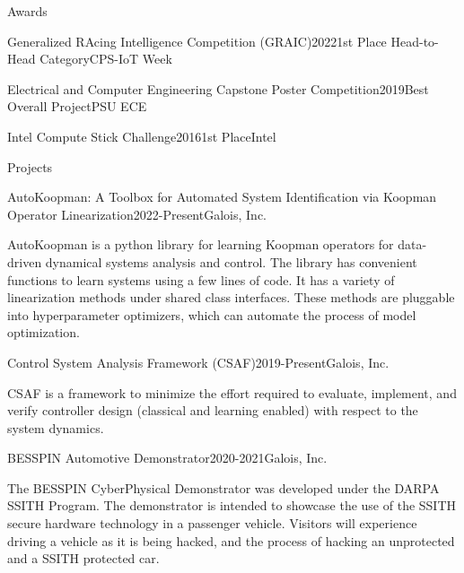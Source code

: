 \documentclass{resume}
\begin{document}
\begin{rSection}{Awards}
\begin{rSubsectionEmpty}{Generalized RAcing Intelligence Competition (GRAIC)}{2022}{1st Place Head-to-Head Category}{CPS-IoT Week}\end{rSubsectionEmpty}

\begin{rSubsectionEmpty}{Electrical and Computer Engineering Capstone Poster Competition}{2019}{Best Overall Project}{PSU ECE}\end{rSubsectionEmpty}

\begin{rSubsectionEmpty}{Intel Compute Stick Challenge}{2016}{1st Place}{Intel}\end{rSubsectionEmpty}
\end{rSection}


\begin{rSection}{Projects}

\begin{rSubsection}{AutoKoopman: A Toolbox for Automated System Identification via Koopman Operator Linearization}{2022-Present}{}{Galois, Inc.}
\item AutoKoopman is a python library for learning Koopman operators for data-driven dynamical systems analysis and control. The library has convenient functions to learn systems using a few lines of code. It has a variety of linearization methods under shared class interfaces. These methods are pluggable into hyperparameter optimizers, which can automate the process of model optimization.
\end{rSubsection}

\begin{rSubsection}{Control System Analysis Framework (CSAF)}{2019-Present}{}{Galois, Inc.}
\item CSAF is a framework to minimize the effort required to evaluate, implement, and verify controller design (classical and learning enabled) with respect to the system dynamics.
\end{rSubsection}

\begin{rSubsection}{BESSPIN Automotive Demonstrator}{2020-2021}{}{Galois, Inc.}
\item The BESSPIN CyberPhysical Demonstrator was developed under the DARPA SSITH Program. The demonstrator is intended to showcase the use of the SSITH secure hardware technology in a passenger vehicle. Visitors will experience driving a vehicle as it is being hacked, and the process of hacking an unprotected and a SSITH protected car. 
\end{rSubsection}

\end{rSection}


\end{document}
